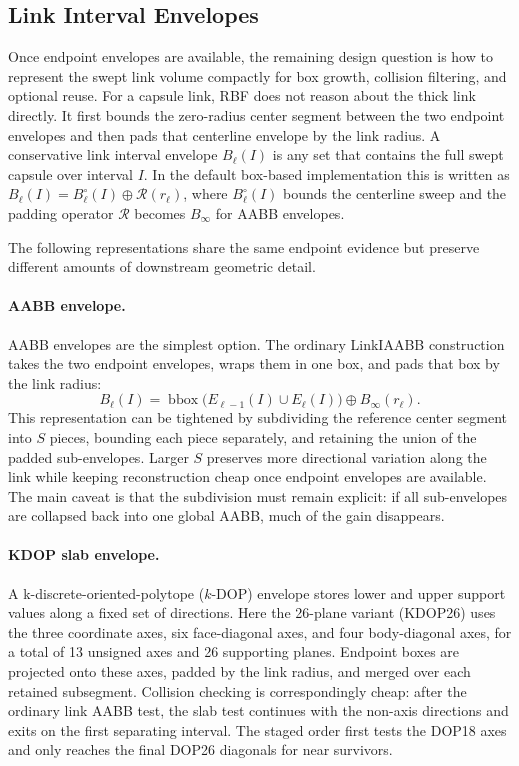 \documentclass[journal]{IEEEtran}
\DeclareRobustCommand{\textsc}[1]{\textnormal{\MakeUppercase{#1}}}
\newcommand{\rbf}{\textsc{RBF}}
\begin{document}
\subsection{Link Interval Envelopes}\label{sec:rewrite_link_env}

Once endpoint envelopes are available, the remaining design question is how to
represent the swept link volume compactly for box growth, collision filtering,
and optional reuse. For a capsule link, \rbf{} does not reason about the thick link directly.
It first bounds the zero-radius center segment between the two endpoint
envelopes and then pads that centerline envelope by the link radius. A
conservative link interval envelope $B_\ell(I)$ is any set that
contains the full swept capsule over interval $I$. In the default box-based
implementation this is written as
$B_\ell(I) = B_\ell^{\circ}(I) \oplus \mathcal{R}(r_\ell)$, where
$B_\ell^{\circ}(I)$ bounds the centerline sweep and the padding operator
$\mathcal{R}$ becomes $B_\infty$ for AABB envelopes.

The following representations share the same endpoint evidence but preserve
different amounts of downstream geometric detail.

\paragraph{AABB envelope.}
AABB envelopes are the simplest option. The ordinary LinkIAABB construction
takes the two endpoint envelopes, wraps them in one box, and pads that box by
the link radius:
\[
B_\ell(I) = \operatorname{bbox}\bigl(E_{\ell-1}(I) \cup E_\ell(I)\bigr)
\oplus B_\infty(r_\ell).
\]
This representation can be tightened by subdividing the reference center
segment into $S$ pieces, bounding each piece separately, and retaining the
union of the padded sub-envelopes. Larger $S$ preserves more directional
variation along the link while keeping reconstruction cheap once endpoint
envelopes are available. The main caveat is that the subdivision must remain
explicit: if all sub-envelopes are collapsed back into one global AABB, much of
the gain disappears.


\paragraph{KDOP slab envelope.}
A k-discrete-oriented-polytope ($k$-DOP) envelope stores lower and upper support values along a fixed set of
directions. Here the 26-plane variant (KDOP26) uses the three
coordinate axes, six face-diagonal axes, and four body-diagonal axes, for a
total of 13 unsigned axes and 26 supporting planes. Endpoint boxes are projected
onto these axes, padded by the link radius, and merged over each retained
subsegment. Collision checking is correspondingly cheap: after the ordinary
link AABB test, the slab test continues with the non-axis directions and exits
on the first separating interval. The staged order first tests the DOP18 axes
and only reaches the final DOP26 diagonals for near survivors.
\end{document}
